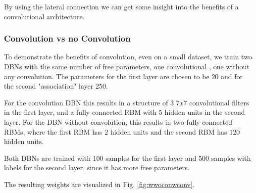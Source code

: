 By using the lateral connection we can get some insight into the benefits of a convolutional architecture.

\subsubsection{Convolution vs no Convolution} \label{c:convvsnoconvexp}

To demonstrate the benefits of convolution, even on a small dataset, we train two DBNs with the same number of free parameters, one convolutional , one without any convolution.
The parameters for the first layer are chosen to be $20$ and for the second "association" layer $250$.

For the convolution DBN this results in a structure of $3$ $7x7$ convolutional filters in the first layer, and a fully connected RBM with $5$ hidden units in the second layer.
For the DBN without convolution, this results in two fully connected RBMs, where the first RBM has $2$ hidden units and the second RBM has $120$ hidden units.

Both DBNs are trained with 100 samples for the first layer and 500 samples with labels for the second layer, since it has more free parameters.

The resulting weights are visualized in Fig. \ref{fig:wwoconwconv}.

